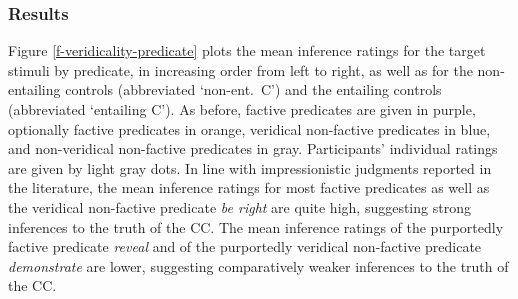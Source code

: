 \documentclass[11pt,fleqn]{article}
\newcommand{\6}{\mbox{$[\hspace*{-.6mm}[$}}
\newcommand{\9}{\mbox{$]\hspace*{-.6mm}]$}}
\begin{document}
\subsubsection{Results}


Figure \ref{f-veridicality-predicate} plots the mean inference ratings for the target stimuli by predicate, in increasing order from left to right, as well as for the non-entailing controls (abbreviated `non-ent.\ C') and the entailing controls (abbreviated `entailing C'). As before, factive predicates are given in purple, optionally factive predicates in orange, veridical non-factive predicates in blue, and non-veridical non-factive predicates in gray. Participants' individual ratings are given by light gray dots. In line with impressionistic judgments reported in the literature, the mean inference ratings for most factive predicates as well as the veridical non-factive predicate {\em be right} are quite high, suggesting strong inferences to the truth of the CC. The mean inference ratings of the purportedly factive predicate {\em reveal} and of the purportedly veridical non-factive predicate {\em demonstrate} are lower, suggesting comparatively weaker inferences to the truth of the CC. 

\end{document}
